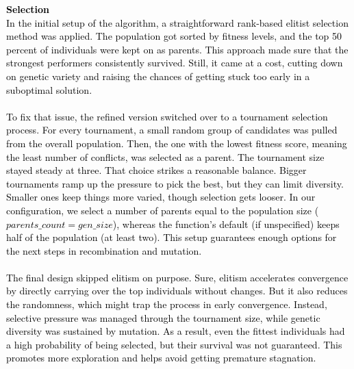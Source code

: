 \documentclass{scrartcl}
\begin{document}
\textcolor{black}{\textbf{Selection \\} In the initial setup of the algorithm, a straightforward rank-based elitist selection method was applied. The population got sorted by fitness levels, and the top 50 percent of individuals were kept on as parents. This approach made sure that the strongest performers consistently survived. Still, it came at a cost, cutting down on genetic variety and raising the chances of getting stuck too early in a suboptimal solution. \\ \\ To fix that issue, the refined version switched over to a tournament selection process. For every tournament, a small random group of candidates was pulled from the overall population. Then, the one with the lowest fitness score, meaning the least number of conflicts, was selected as a parent. The tournament size stayed steady at three. That choice strikes a reasonable balance. Bigger tournaments ramp up the pressure to pick the best, but they can limit diversity. Smaller ones keep things more varied, though selection gets looser. In our configuration, we select a number of parents equal to the population size ($parents\_count = gen\_size$), whereas the function’s default (if unspecified) keeps half of the population (at least two). This setup guarantees enough options for the next steps in recombination and mutation. \\ \\ The final design skipped elitism on purpose. Sure, elitism accelerates convergence by directly carrying over the top individuals without changes. But it also reduces the randomness, which might trap the process in early convergence. Instead, selective pressure was managed through the tournament size, while genetic diversity was sustained by mutation. As a result, even the fittest individuals had a high probability of being selected, but their survival was not guaranteed. This promotes more exploration and helps avoid getting premature stagnation.}
\end{document}

